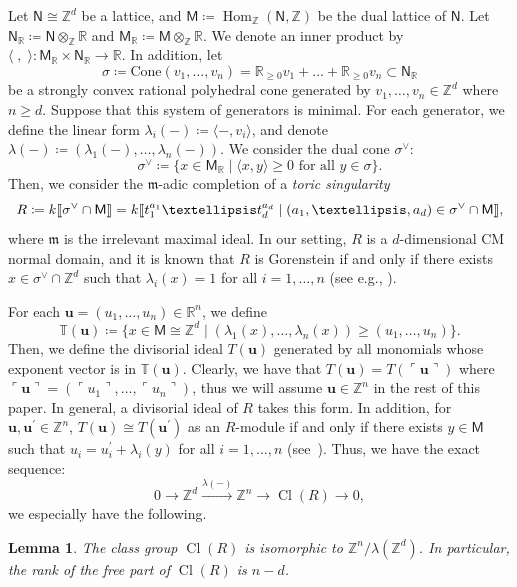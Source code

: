 \documentclass[11pt]{amsart}
\newtheorem{lemm}[theo]{Lemma}
\theoremstyle{definition}
\newcommand{\fkm}{\mathfrak{m}}
\newcommand{\ZZ}{\mathbb{Z}}
\newcommand{\RR}{\mathbb{R}}
\newcommand{\sfM}{\mathsf{M}}
\newcommand{\sfN}{\mathsf{N}}
\DeclareMathOperator{\Hom}{Hom}
\DeclareMathOperator{\Cl}{Cl}
\newcommand{\llbracket}{\mathopen{[\mkern -2.7mu[}}
\newcommand{\rrbracket}{\mathclose{]\mkern -2.7mu]}}
\begin{document}
Let $\sfN\cong\ZZ^d$ be a lattice, and $\sfM\coloneqq\Hom_\ZZ(\sfN, \ZZ)$ be the dual lattice of $\sfN$. Let $\sfN_\RR\coloneqq\sfN\otimes_\ZZ\RR$ and $\sfM_\RR\coloneqq\sfM\otimes_\ZZ\RR$. We denote an inner product by $\langle\;,\;\rangle:\sfM_\RR\times\sfN_\RR\rightarrow\RR$. In addition, let
\[
\sigma\coloneqq\mathrm{Cone}(v_1, \ldots, v_n)=\RR_{\ge 0}v_1+\dots +\RR_{\ge 0}v_n
\subset\sfN_\RR
\]
be a strongly convex rational polyhedral cone generated by $v_1, \ldots, v_n\in\ZZ^d$ where $n\ge d$. Suppose that this system of generators is minimal. For each generator, we define the linear form $\lambda_i(-)\coloneqq\langle-, v_i\rangle$, and denote $\lambda(-)\coloneqq(\lambda_1(-),\dots,\lambda_n(-))$. We consider the dual cone $\sigma^\vee$:
\[
\sigma^\vee\coloneqq\{x\in\sfM_\RR \mid \langle x,y\rangle\ge0 \text{ for all } y\in\sigma \}.
\]
Then, we consider the $\fkm$-adic completion of a \emph{toric singularity}
\[
R\coloneqq k\llbracket \sigma^\vee\cap\sfM\rrbracket =k\llbracket t_1^{a_1}\dots t_d^{a_d}\mid (a_1, \ldots, a_d)\in\sigma^\vee\cap\sfM\rrbracket ,
\]
where $\fkm$ is the irrelevant maximal ideal. In our setting, $R$ is a $d$-dimensional CM normal domain, and it is known that $R$ is Gorenstein if and only if there exists $x\in\sigma^\vee\cap\ZZ^d$ such that $\lambda_i(x)=1$ for all $i=1, \ldots, n$ (see e.g., \cite[Theorem~6.33]{BG2}).

For each $\mathbf{u}=(u_1, \ldots, u_n)\in\RR^n$, we define
\[
\mathbb{T}(\mathbf{u})\coloneqq\{x\in\sfM\cong\ZZ^d \mid (\lambda_1(x), \ldots, \lambda_n(x))\ge(u_1, \ldots, u_n)\}.
\]
Then, we define the divisorial ideal $T(\mathbf{u})$ generated by all monomials whose exponent vector is in $\mathbb{T}(\mathbf{u})$. Clearly, we have that $T(\mathbf{u})=T(\ulcorner \mathbf{u}\urcorner)$ where $\ulcorner \mathbf{u}\urcorner=(\ulcorner u_1\urcorner, \ldots, \ulcorner u_n\urcorner)$, thus we will assume $\mathbf{u}\in\ZZ^n$ in the rest of this paper. In general, a divisorial ideal of $R$ takes this form. In addition, for $\mathbf{u}, \mathbf{u}^\prime\in\ZZ^n$, $T(\mathbf{u})\cong T(\mathbf{u}^\prime)$ as an $R$-module if and only if there exists $y\in\sfM$ such that $u_i=u_i^\prime+\lambda_i(y)$ for all $i=1, \ldots, n$ (see~\cite[Corollary~4.56]{BG2}). Thus, we have the exact sequence:
\[
0\rightarrow\ZZ^d\xrightarrow{\lambda(-)}\ZZ^n\rightarrow\Cl(R)\rightarrow0,
\]
we especially have the following.

\begin{lemm}\label{cl_toric}
The class group $\Cl(R)$ is isomorphic to $\ZZ^n/\lambda(\ZZ^d)$. In particular, the rank of the free part of $\Cl(R)$ is $n-d$.
\end{lemm}
\end{document}
